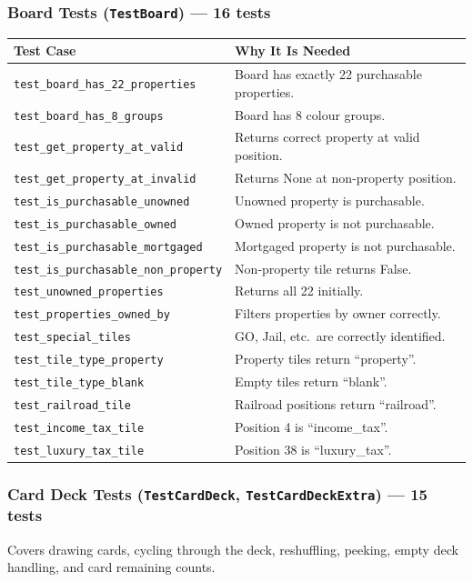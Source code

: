 \documentclass[12pt,a4paper]{article}
\begin{document}
\subsubsection{Board Tests (\texttt{TestBoard}) --- 16 tests}
\begin{longtable}{p{5.8cm} p{6.2cm}}
\toprule
\textbf{Test Case} & \textbf{Why It Is Needed} \\
\midrule
\texttt{test\_board\_has\_22\_properties} & Board has exactly 22 purchasable properties. \\
\texttt{test\_board\_has\_8\_groups} & Board has 8 colour groups. \\
\texttt{test\_get\_property\_at\_valid} & Returns correct property at valid position. \\
\texttt{test\_get\_property\_at\_invalid} & Returns None at non-property position. \\
\texttt{test\_is\_purchasable\_unowned} & Unowned property is purchasable. \\
\texttt{test\_is\_purchasable\_owned} & Owned property is not purchasable. \\
\texttt{test\_is\_purchasable\_mortgaged} & Mortgaged property is not purchasable. \\
\texttt{test\_is\_purchasable\_non\_property} & Non-property tile returns False. \\
\texttt{test\_unowned\_properties} & Returns all 22 initially. \\
\texttt{test\_properties\_owned\_by} & Filters properties by owner correctly. \\
\texttt{test\_special\_tiles} & GO, Jail, etc.\ are correctly identified. \\
\texttt{test\_tile\_type\_property} & Property tiles return ``property''. \\
\texttt{test\_tile\_type\_blank} & Empty tiles return ``blank''. \\
\texttt{test\_railroad\_tile} & Railroad positions return ``railroad''. \\
\texttt{test\_income\_tax\_tile} & Position 4 is ``income\_tax''. \\
\texttt{test\_luxury\_tax\_tile} & Position 38 is ``luxury\_tax''. \\
\bottomrule
\end{longtable}

\subsubsection{Card Deck Tests (\texttt{TestCardDeck}, \texttt{TestCardDeckExtra}) --- 15 tests}
Covers drawing cards, cycling through the deck, reshuffling, peeking, empty deck handling, and card remaining counts.
\end{document}

